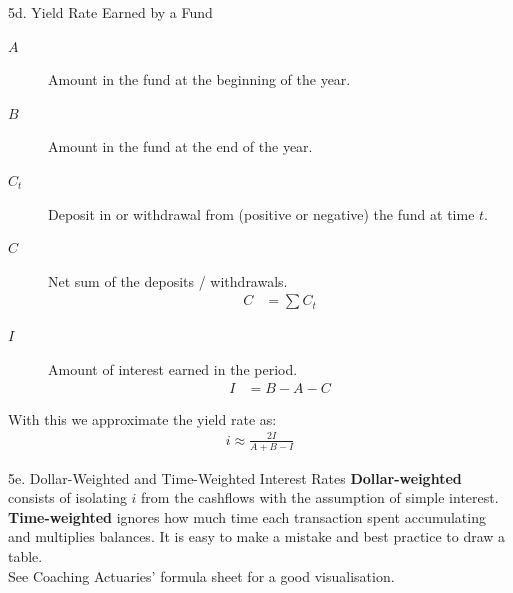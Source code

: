 \begin{CHPT_SUMM_AUTO}[label = {L.-5d}]{5d. Yield Rate Earned by a Fund}
\begin{description}
	\item[$A$]	Amount in the fund at the beginning of the year.
	\item[$B$]	Amount in the fund at the end of the year.
	\item[$C_{t}$]	Deposit in or withdrawal from (positive or negative) the fund at time $t$.
	\item[$C$]	Net sum of the deposits / withdrawals.
		\begin{align*}
		C	&=	\sum C_{t}
		\end{align*}
	\item[$I$]	Amount of interest earned in the period.
		\begin{align*}
		I	&=	B - A - C
		\end{align*}
\end{description}

With this we approximate the yield rate as:
\begin{align*}
	i
	\approx	\frac{2I}{A + B - I}
\end{align*}
\end{CHPT_SUMM_AUTO}

\begin{CHPT_SUMM_AUTO}[label = {L.-5e}]{5e. Dollar-Weighted and Time-Weighted Interest Rates}
\textbf{Dollar-weighted} consists of isolating $i$ from the cashflows with the assumption of simple interest.
\textbf{Time-weighted} ignores how much time each transaction spent accumulating and multiplies balances. It is easy to make a mistake and best practice to draw a table. \\

See Coaching Actuaries' formula sheet for a good visualisation.
\end{CHPT_SUMM_AUTO}

